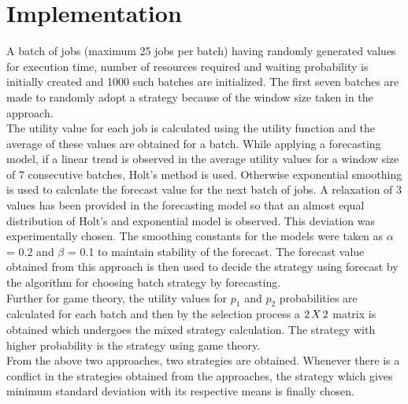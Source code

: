 \documentclass[conference]{IEEEtran}
\begin{document}
\section{Implementation}
A batch of jobs (maximum 25 jobs per batch) having randomly generated values for execution time, number of resources required and waiting probability is initially created and 1000 such batches are initialized. The first seven batches are made to randomly adopt a strategy because of the window size taken in the approach.\\[0.2cm]
The utility value for each job is calculated using the utility function and the average of these values are obtained for a batch. While applying a forecasting model, if a linear trend is observed in the average utility values for a window size of 7 consecutive batches, Holt's method is used. Otherwise exponential smoothing is used to calculate the forecast value for the next batch of jobs. A relaxation of 3 values has been provided in the forecasting model so that an almost equal distribution of Holt's and exponential model is observed. This deviation was experimentally chosen. The smoothing constants for the models were taken as $\alpha$ = 0.2 and $\beta$ = 0.1 to maintain stability of the forecast. The forecast value obtained from this approach is then used to decide the strategy using forecast by the algorithm for choosing batch strategy by forecasting.\\[0.2cm]
Further for game theory, the utility values for $p_1$ and $p_2$ probabilities are calculated for each batch and then by the selection process a $2\hspace*{0.5mm}X\hspace*{0.5mm}2$ matrix is obtained which undergoes the mixed strategy calculation. The strategy with higher probability is the strategy using game theory.\\[0.2cm]
From the above two approaches, two strategies are obtained. Whenever there is a conflict in the strategies obtained from the approaches, the strategy which gives minimum standard deviation with its respective means is finally chosen.\\[0.2cm]
\end{document}
